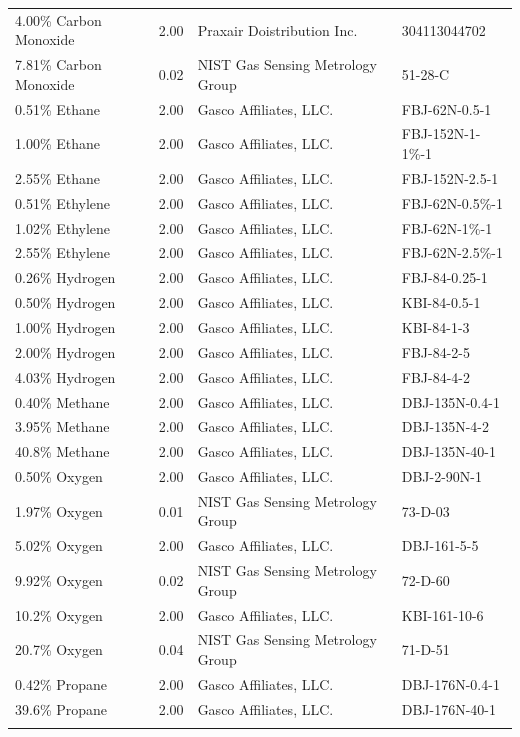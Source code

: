 \documentclass[12pt]{article}
\begin{document}
\begin{table}[h!]
\begin{tabular}{lcll}
4.00\% Carbon Monoxide	&	2.00	&	Praxair Doistribution Inc. 	&	304113044702		\\
7.81\% Carbon Monoxide	&	0.02	&	NIST Gas Sensing Metrology Group 		&	51-28-C	\\
0.51\% Ethane		&	2.00	&	Gasco Affiliates, LLC.		&	FBJ-62N-0.5-1		\\
1.00\% Ethane		&	2.00	&	Gasco Affiliates, LLC.		&	FBJ-152N-1-1\%-1		\\
2.55\% Ethane		&	2.00	&	Gasco Affiliates, LLC.		&	FBJ-152N-2.5-1		\\
0.51\% Ethylene		&	2.00	&	Gasco Affiliates, LLC.		&	FBJ-62N-0.5\%-1		\\
1.02\% Ethylene		&	2.00	&	Gasco Affiliates, LLC.		&	FBJ-62N-1\%-1		\\
2.55\% Ethylene		&	2.00	&	Gasco Affiliates, LLC.		&	FBJ-62N-2.5\%-1		\\
0.26\% Hydrogen		&	2.00	&	Gasco Affiliates, LLC.		&	FBJ-84-0.25-1		\\
0.50\% Hydrogen		&	2.00	&	Gasco Affiliates, LLC.		&	KBI-84-0.5-1		\\
1.00\% Hydrogen		&	2.00	&	Gasco Affiliates, LLC.		&	KBI-84-1-3		\\
2.00\% Hydrogen		&	2.00	&	Gasco Affiliates, LLC.		&	FBJ-84-2-5		\\
4.03\% Hydrogen		&	2.00	&	Gasco Affiliates, LLC.		&	FBJ-84-4-2		\\
0.40\% Methane		&	2.00	&	Gasco Affiliates, LLC. 		&	DBJ-135N-0.4-1		\\
3.95\% Methane		&	2.00	&	Gasco Affiliates, LLC.		&	DBJ-135N-4-2		\\
40.8\% Methane		&	2.00	&	Gasco Affiliates, LLC.		&	DBJ-135N-40-1		\\
0.50\% Oxygen		&	2.00	&	Gasco Affiliates, LLC. 		&	DBJ-2-90N-1		\\
1.97\% Oxygen		&	0.01	&	NIST Gas Sensing Metrology Group		&	73-D-03		\\
5.02\% Oxygen		&	2.00	&	Gasco Affiliates, LLC.		&	DBJ-161-5-5		\\
9.92\% Oxygen		&	0.02	&	NIST Gas Sensing Metrology Group		&	72-D-60		\\
10.2\% Oxygen		&	2.00	&	Gasco Affiliates, LLC. 		&	KBI-161-10-6		\\
20.7\% Oxygen		&	0.04	&	NIST Gas Sensing Metrology Group		&	71-D-51		\\
0.42\% Propane		&	2.00	&	Gasco Affiliates, LLC.		&	DBJ-176N-0.4-1		\\
39.6\% Propane		&	2.00	&	Gasco Affiliates, LLC. 		&	DBJ-176N-40-1		\\
\\[0.005cm]
\hline
\end{tabular}
\end{table}
\end{document}
